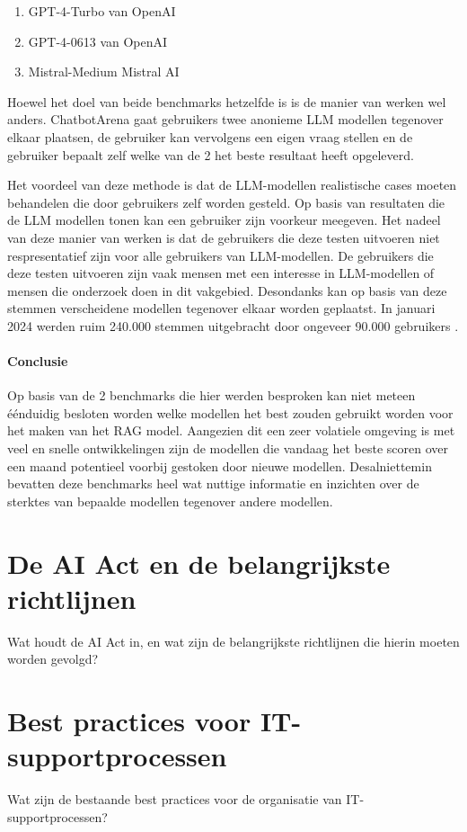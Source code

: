     \begin{enumerate}
        \item GPT-4-Turbo van OpenAI
        \item GPT-4-0613 van OpenAI
        \item Mistral-Medium Mistral AI
    \end{enumerate}
    
    Hoewel het doel van beide benchmarks hetzelfde is is de manier van werken wel anders. ChatbotArena gaat gebruikers twee anonieme LLM modellen tegenover elkaar plaatsen, de gebruiker kan vervolgens een eigen vraag stellen en de gebruiker bepaalt zelf welke van de 2 het beste resultaat heeft opgeleverd.
    
    Het voordeel van deze methode is dat de LLM-modellen realistische cases moeten behandelen die door gebruikers zelf worden gesteld. Op basis van resultaten die de LLM modellen tonen kan een gebruiker zijn voorkeur meegeven. Het nadeel van deze manier van werken is dat de gebruikers die deze testen uitvoeren niet respresentatief zijn voor alle gebruikers van LLM-modellen. De gebruikers die deze testen uitvoeren zijn vaak mensen met een interesse in LLM-modellen of mensen die onderzoek doen in dit vakgebied. Desondanks kan op basis van deze stemmen verscheidene modellen tegenover elkaar worden geplaatst. In januari 2024 werden ruim 240.000 stemmen uitgebracht door ongeveer 90.000 gebruikers \autocite{Chiang2024}. 
    
    
    \paragraph{Conclusie}
    Op basis van de 2 benchmarks die hier werden besproken kan niet meteen éénduidig besloten worden welke modellen het best zouden gebruikt worden voor het maken van het RAG model. Aangezien dit een zeer volatiele omgeving is met veel en snelle ontwikkelingen zijn de modellen die vandaag het beste scoren over een maand potentieel voorbij gestoken door nieuwe modellen. Desalniettemin bevatten deze benchmarks heel wat nuttige informatie en inzichten over de sterktes van bepaalde modellen tegenover andere modellen. 
    

\section{De AI Act en de belangrijkste richtlijnen}
Wat houdt de AI Act in, en wat zijn de belangrijkste richtlijnen die hierin moeten worden gevolgd?

\section{Best practices voor IT-supportprocessen}
Wat zijn de bestaande best practices voor de organisatie van IT-supportprocessen?
